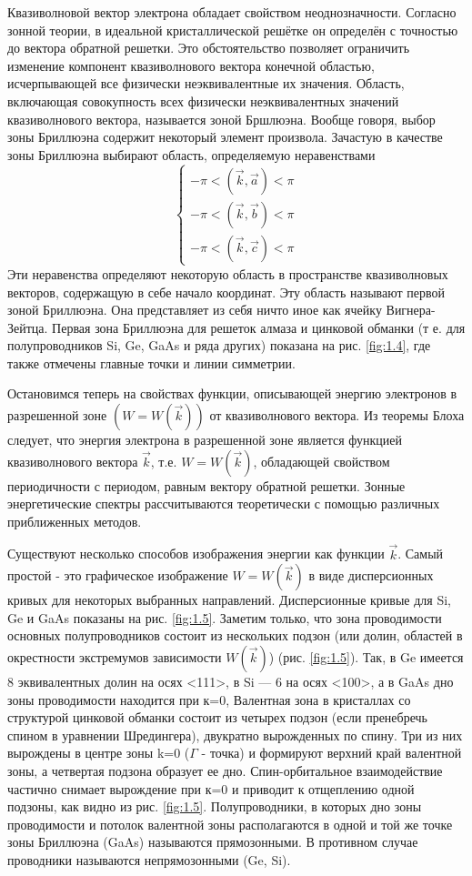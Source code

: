 		Квазиволновой вектор электрона обладает свойством неоднозначности. Согласно зонной теории, в идеальной кристаллической
		решётке он определён с точностью до вектора обратной решетки. Это обстоятельство позволяет ограничить изменение
		компонент квазиволнового вектора конечной областью, исчерпывающей все физически неэквивалентные их значения. Область,
		включающая совокупность всех физически неэквивалентных значений квазиволнового вектора, называется зоной Бршлюэна.
		Вообще говоря, выбор зоны Бриллюэна содержит некоторый элемент произвола. Зачастую в качестве зоны Бриллюэна выбирают
		область, определяемую неравенствами
		\begin{equation}
		\left\{\begin{array}{l}{-\pi<(\vec{k}, \vec{a})<\pi} \\ {-\pi<(\vec{k}, \vec{b})<\pi} \\ {-\pi<(\vec{k}, \vec{c})<\pi}\end{array}\right.
		\label{eq:1.6}
		\end{equation}
		Эти неравенства определяют некоторую область в пространстве квазиволновых векторов, содержащую в себе начало координат.
		Эту область называют первой зоной Бриллюэна. Она представляет из себя ничто иное как ячейку Вигнера-Зейтца. Первая зона
		Бриллюэна для решеток алмаза и цинковой обманки (т е. для полупроводников Si, Ge, GaAs и ряда других) показана на рис.
		\ref{fig:1.4}, где также отмечены главные точки и линии симметрии.
		
		Остановимся теперь на свойствах функции, описывающей энергию электронов в разрешенной зоне $(W=W(\vec{k}))$ от квазиволнового
		вектора. Из теоремы Блоха следует, что энергия электрона в разрешенной зоне является функцией квазиволнового вектора $\vec{k}$,
		т.е. $W=W(\vec{k})$, обладающей свойством периодичности с периодом, равным вектору обратной решетки. Зонные энергетические
		спектры рассчитываются теоретически с помощью различных приближенных методов.
		
		Существуют несколько способов изображения энергии как функции $\vec{k}$. Самый простой - это графическое изображение $W=W(\vec{k})$ в
		виде дисперсионных кривых для некоторых выбранных направлений. Дисперсионные кривые для Si, Ge и GaAs показаны на рис.
		\ref{fig:1.5}. Заметим только, что зона проводимости основных полупроводников состоит из нескольких подзон (или долин, областей в
		окрестности экстремумов зависимости  $W(\vec{k})$) (рис. \ref{fig:1.5}). Так, в Ge имеется 8 эквивалентных долин на осях <111>, в Si — 6 на
		осях <100>, а в GaAs дно зоны проводимости находится при к=0, Валентная зона в кристаллах со структурой цинковой обманки
		состоит из четырех подзон (если пренебречь спином в уравнении Шредингера), двукратно вырожденных по спину. Три из них
		вырождены в центре зоны k=0 ($\Gamma$ - точка) и формируют верхний край валентной зоны, а четвертая подзона образует ее дно.
		Спин-орбитальное взаимодействие частично снимает вырождение при к=0 и приводит к отщеплению одной подзоны, как видно из
		рис. \ref{fig:1.5}. Полупроводники, в которых дно зоны проводимости и потолок валентной зоны располагаются в одной и той же точке
		зоны Бриллюэна (GaAs) называются прямозонными. В противном случае проводники называются непрямозонными (Ge, Si).
		
